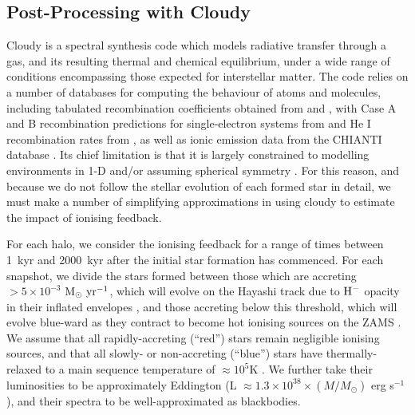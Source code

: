 \documentclass[twocolumn,iop,revtex4]{openjournal}
\newcommand{\msolaryrc} {$\rm{M_{\odot}~yr^{-1}}$}
\begin{document}
\subsection{Post-Processing with Cloudy}
\label{cloudy:description}
      {\sc Cloudy} \citep{Ferland_2017} is a spectral synthesis code which models radiative transfer
      through a gas, and its resulting thermal and chemical equilibrium, under a wide range of conditions
      encompassing those expected for interstellar matter. %
      The code relies on a number of databases for computing the behaviour of atoms and molecules,
      including tabulated recombination coefficients obtained from \cite{Badnell_2003}
      and \cite{Badnell_2006}, with Case A and B recombination predictions for single-electron
      systems from \cite{Storey_1995} and He I recombination rates from \cite{Porter_2012},
      as well as ionic emission data from the CHIANTI database \citep{Dere_1997,Dere_2012}.
      Its chief limitation is that it is largely constrained to modelling environments in 1-D
      and/or assuming spherical symmetry \citep[though see, e.g.,][for recent efforts to extend
        its implementation to pseudo-3D problems]{Morisset_2013, Fitzgerald_2020}. For this
      reason, and because we do not follow the stellar evolution of each formed star in detail,
      we must make a number of simplifying approximations in using {\sc cloudy} to estimate
      the impact of ionising feedback. 

For each halo, we consider the ionising feedback for a range of times between 1~kyr and 2000~kyr
after the initial star formation has commenced. For each snapshot, we divide the stars formed between
those which are accreting $> 5 \times 10^{-3}$ \msolaryrc, which will evolve on the Hayashi track due
to $\rm{H}^{-}$ opacity in their inflated envelopes \citep[e.g.,][]{Hosokawa_2013}, and those accreting
below this threshold, which will evolve blue-ward as they contract to become hot ionising sources on
the ZAMS \citep{Haemmerle_2017}. We assume that all rapidly-accreting (``red'') stars remain negligible
ionising sources, and that all slowly- or non-accreting (``blue'') stars have thermally-relaxed to a
main sequence temperature of $\approx 10^{5}$K \citep{Schaerer_2002, Woods_2020}. We further take
their luminosities to be approximately Eddington (L $\approx 1.3\times 10^{38} \times (M/M_{\odot})$
erg s$^{-1}$), and their spectra to be well-approximated as blackbodies.
\end{document}
